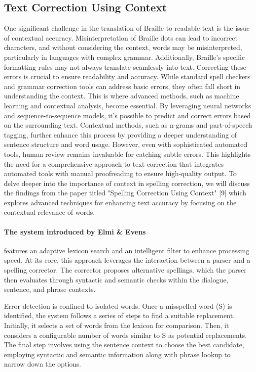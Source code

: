 \subsection{Text Correction Using Context}

One significant challenge in the translation of Braille to readable text is the issue of contextual accuracy. Misinterpretation of Braille dots can lead to incorrect characters, and without considering the context, words may be misinterpreted, particularly in languages with complex grammar. Additionally, Braille's specific formatting rules may not always translate seamlessly into text. Correcting these errors is crucial to ensure readability and accuracy. While standard spell checkers and grammar correction tools can address basic errors, they often fall short in understanding the context. This is where advanced methods, such as machine learning and contextual analysis, become essential. By leveraging neural networks and sequence-to-sequence models, it's possible to predict and correct errors based on the surrounding text. Contextual methods, such as n-grams and part-of-speech tagging, further enhance this process by providing a deeper understanding of sentence structure and word usage. However, even with sophisticated automated tools, human review remains invaluable for catching subtle errors. This highlights the need for a comprehensive approach to text correction that integrates automated tools with manual proofreading to ensure high-quality output. To delve deeper into the importance of context in spelling correction, we will discuss the findings from the paper titled "Spelling Correction Using Context" [9] which explores advanced techniques for enhancing text accuracy by focusing on the contextual relevance of words.

\paragraph{The system introduced by Elmi \& Evens}
 features an adaptive lexicon search and an intelligent filter to enhance processing speed. At its core, this approach leverages the interaction between a parser and a spelling corrector. The corrector proposes alternative spellings, which the parser then evaluates through syntactic and semantic checks within the dialogue, sentence, and phrase contexts.

Error detection is confined to isolated words. Once a misspelled word (S) is identified, the system follows a series of steps to find a suitable replacement. Initially, it selects a set of words from the lexicon for comparison. Then, it considers a configurable number of words similar to S as potential replacements. The final step involves using the sentence context to choose the best candidate, employing syntactic and semantic information along with phrase lookup to narrow down the options.

